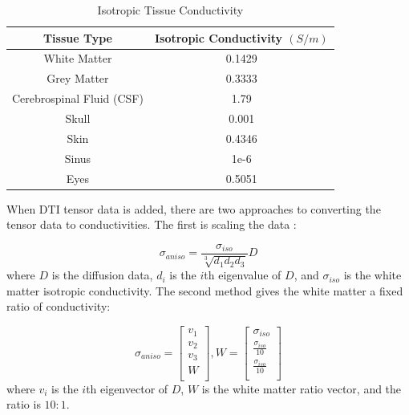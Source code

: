 \begin{table}[H]
\centering
\caption{Isotropic Tissue Conductivity}
\label{tab:cond}
\begin{tabular}{|c|c|}
\hline
Tissue Type               & Isotropic Conductivity $(S/m)$ \\ \hline
White Matter              & 0.1429                         \\ \hline
Grey Matter               & 0.3333                         \\ \hline
Cerebrospinal Fluid (CSF) & 1.79                           \\ \hline
Skull                     & 0.001                          \\ \hline
Skin                      & 0.4346                         \\ \hline
Sinus                     & 1e-6                           \\ \hline
Eyes                      & 0.5051                         \\ \hline
\end{tabular}
\end{table}

When DTI tensor data is added, there are two approaches to converting the tensor data to conductivities. The first is scaling the data \cite{ref:scaling}: 

\begin{equation}
\label{eq:scaling}
\sigma_{aniso} = \frac{\sigma_{iso}}{\sqrt[3]{d_1d_2d_3}}D
\end{equation}
where $D$ is the diffusion data, $d_i$ is the $i$th eigenvalue of $D$, and $\sigma_{iso}$ is the white matter isotropic conductivity. The second method gives the white matter a fixed ratio of conductivity:

\begin{equation}
\label{eq:fixed}
\sigma_{aniso} = \begin{bmatrix}
v_1\\
v_2\\
v_3\\
W\\
\end{bmatrix}, 
W = \begin{bmatrix}
\sigma_{iso}\\
\frac{\sigma_{iso}}{10}\\
\frac{\sigma_{iso}}{10}\\
\end{bmatrix}
\end{equation}
where $v_i$ is the $i$th eigenvector of $D$, $W$ is the white matter ratio vector, and the ratio is $10:1$.

